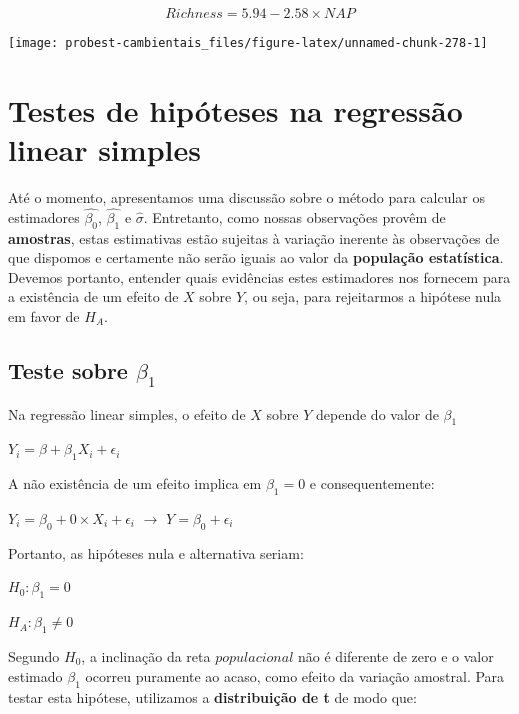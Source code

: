 \documentclass[
]{book}
\begin{document}
\[Richness = 5.94 -2.58 \times NAP\]

\begin{center}\texttt{[image: probest-cambientais\_files/figure-latex/unnamed-chunk-278-1]} \end{center}

\hypertarget{testes-de-hipuxf3teses-na-regressuxe3o-linear-simples}{%
\section{Testes de hipóteses na regressão linear simples}\label{testes-de-hipuxf3teses-na-regressuxe3o-linear-simples}}

Até o momento, apresentamos uma discussão sobre o método para calcular os estimadores \(\hat{\beta_0}\), \(\hat{\beta_1}\) e \(\hat{\sigma}\). Entretanto, como nossas observações provêm de \textbf{amostras}, estas estimativas estão sujeitas à variação inerente às observações de que dispomos e certamente não serão iguais ao valor da \textbf{população estatística}. Devemos portanto, entender quais evidências estes estimadores nos fornecem para a existência de um efeito de \(X\) sobre \(Y\), ou seja, para rejeitarmos a hipótese nula em favor de \(H_A\).

\hypertarget{teste-sobre-beta_1}{%
\subsection{\texorpdfstring{Teste sobre \(\beta_1\)}{Teste sobre \textbackslash beta\_1}}\label{teste-sobre-beta_1}}

Na regressão linear simples, o efeito de \(X\) sobre \(Y\) depende do valor de \(\beta_1\)

\(Y_i = \beta + \beta_1X_i + \epsilon_i\)

A não existência de um efeito implica em \(\beta_1 = 0\) e consequentemente:

\(Y_i = \beta_0 + 0 \times X_i + \epsilon_i\) \(\rightarrow\) \(Y = \beta_0 + \epsilon_i\)

Portanto, as hipóteses nula e alternativa seriam:

\(H_0: \beta_1 = 0\)

\(H_A: \beta_1 \ne 0\)

Segundo \(H_0\), a inclinação da reta \(populacional\) não é diferente de zero e o valor estimado \(\hat{\beta_1}\) ocorreu puramente ao acaso, como efeito da variação amostral. Para testar esta hipótese, utilizamos a \textbf{distribuição de t} de modo que:
\end{document}
